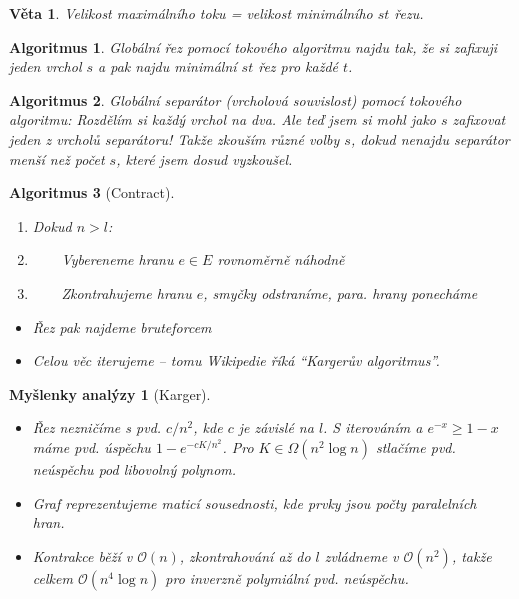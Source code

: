 \documentclass{article}
\theoremstyle{noparens}
\newtheorem*{thm}{Věta}
\newtheorem*{alg}{Algoritmus}
\theoremstyle{noparens-mys}
\newtheorem*{anal-mys}{Myšlenky analýzy}
\theoremstyle{noparens-note}
\newcommand{\OO}{\mathcal{O}}
\begin{document}
\begin{thm}
    Velikost maximálního toku = velikost minimálního $st$ řezu.
\end{thm}

\begin{alg}
    Globální řez pomocí tokového algoritmu najdu tak, že si zafixuji jeden
    vrchol $s$ a pak najdu minimální $st$ řez pro každé $t$.
\end{alg}

\begin{alg}
    Globální separátor (vrcholová souvislost) pomocí tokového algoritmu:
    Rozdělím si každý vrchol na dva.  Ale teď jsem si mohl jako $s$ zafixovat
    jeden z vrcholů separátoru!  Takže zkouším různé volby $s$, dokud nenajdu
    separátor menší než počet $s$, které jsem dosud vyzkoušel.
\end{alg}

\begin{alg}[Contract]
    ~

    \begin{enumerate}
        \item Dokud $n > l$:
        \item ~~~~Vybereneme hranu $e \in E$ rovnoměrně náhodně
        \item ~~~~Zkontrahujeme hranu $e$, smyčky odstraníme, para. hrany
            ponecháme
    \end{enumerate}

    \begin{itemize}
        \item Řez pak najdeme bruteforcem
        \item Celou věc iterujeme -- tomu Wikipedie říká
            \enquote{Kargerův algoritmus}.
    \end{itemize}
\end{alg}

\begin{anal-mys}[Karger]
    ~

    \begin{itemize}
        \item Řez nezničíme s pvd. $c / n^2$, kde $c$ je závislé na $l$. S
            iterováním a $e^{-x} \ge 1 - x$ máme pvd. úspěchu $1 - e^{-cK /
            n^2}$. Pro $K \in \Omega(n^2 \log n)$ stlačíme pvd. neúspěchu pod
            libovolný polynom.
        \item Graf reprezentujeme maticí sousednosti, kde prvky jsou počty
            paralelních hran.
        \item Kontrakce běží v $\OO(n)$, zkontrahování až do $l$ zvládneme v
            $\OO(n^2)$, takže celkem $\OO(n^4 \log n)$ pro inverzně polymiální
            pvd. neúspěchu.
    \end{itemize}
\end{anal-mys}
\end{document}
